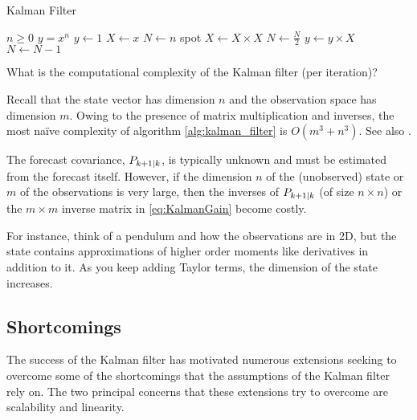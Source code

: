 \begin{algorithm}
\caption{Kalman Filter}\label{alg:kalman_filter}
\begin{algorithmic}
\Require $n \geq 0$
\Ensure $y = x^n$
\State $y \gets 1$
\State $X \gets x$
\State $N \gets n$
spot
    \State $X \gets X \times X$
    \State $N \gets \frac{N}{2}$  
    \State $y \gets y \times X$
    \State $N \gets N - 1$
\EndIf
\EndWhile
\end{algorithmic}
\end{algorithm}

\begin{question}
What is the computational complexity of the Kalman filter (per iteration)?
\end{question}
\begin{answer}
Recall that the state vector has dimension $n$ and the observation space has dimension $m$.
Owing to the presence of matrix multiplication and inverses, the most na\"ive complexity of
algorithm \ref{alg:kalman_filter} is $O(m^3 + n^3)$.
See also \cite{saibaba2015fast}.
\end{answer}

The forecast covariance, $P_{k+1|k}$, is typically unknown and must be estimated from the forecast
itself. However, if the dimension $n$ of the (unobserved) state or $m$ of the observations is very
large, then the inverses of $P_{k+1|k}$ (of size $n\times n$) or the $m\times m$ inverse matrix
in \eqref{eq:KalmanGain} become costly. 

\begin{example}
For instance, think of a pendulum and how the observations are in 2D, but the state contains
approximations of higher order moments like derivatives in addition to it. As you keep adding Taylor
terms, the dimension of the state increases.
\end{example}

\subsection{Shortcomings}\label{sec:shortcomings_and_overview}

The success of the Kalman filter has motivated numerous extensions seeking to overcome
some of the shortcomings that the assumptions of the Kalman filter rely on. The two
principal concerns that these extensions try to overcome are scalability and linearity.\\

